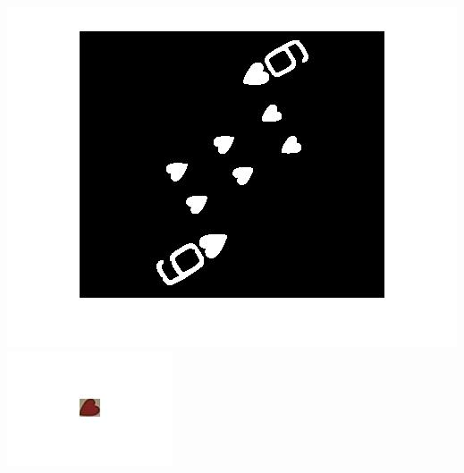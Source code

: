 \documentclass[11pt]{article}
\theoremstyle{plain}
\theoremstyle{definition}
\begin{document}
  \includegraphics[scale=0.2]{rotate_works.jpg}
  \includegraphics[scale=0.4]{rotate2.jpg}
\end{document}
